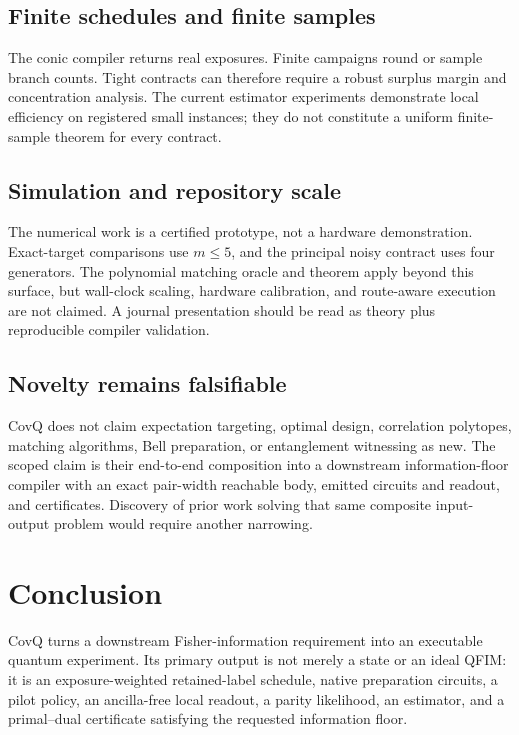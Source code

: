\documentclass[11pt]{article}
\theoremstyle{definition}
\theoremstyle{remark}
\begin{document}
\subsection{Finite schedules and finite samples}
The conic compiler returns real exposures. Finite campaigns round or sample branch counts. Tight contracts can therefore require a robust surplus margin and concentration analysis. The current estimator experiments demonstrate local efficiency on registered small instances; they do not constitute a uniform finite-sample theorem for every contract.

\subsection{Simulation and repository scale}
The numerical work is a certified prototype, not a hardware demonstration. Exact-target comparisons use $m\le5$, and the principal noisy contract uses four generators. The polynomial matching oracle and theorem apply beyond this surface, but wall-clock scaling, hardware calibration, and route-aware execution are not claimed. A journal presentation should be read as theory plus reproducible compiler validation.

\subsection{Novelty remains falsifiable}
CovQ does not claim expectation targeting, optimal design, correlation polytopes, matching algorithms, Bell preparation, or entanglement witnessing as new. The scoped claim is their end-to-end composition into a downstream information-floor compiler with an exact pair-width reachable body, emitted circuits and readout, and certificates. Discovery of prior work solving that same composite input-output problem would require another narrowing.

\section{Conclusion}

CovQ turns a downstream Fisher-information requirement into an executable quantum experiment. Its primary output is not merely a state or an ideal QFIM: it is an exposure-weighted retained-label schedule, native preparation circuits, a pilot policy, an ancilla-free local readout, a parity likelihood, an estimator, and a primal--dual certificate satisfying the requested information floor.
\end{document}
